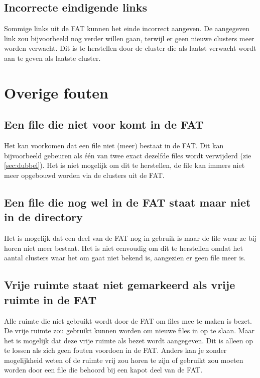 \documentclass[11pt]{article}
\begin{document}
	\subsection{Incorrecte eindigende links}\label{sec:links}
	Sommige links uit de FAT kunnen het einde incorrect aangeven. De aangegeven link zou bijvoorbeeld nog verder willen gaan, terwijl er geen nieuwe clusters meer worden verwacht. Dit is te herstellen door de cluster die als laatst verwacht wordt aan te geven als laatste cluster.

	\newpage

	\section{Overige fouten}\label{sec:overige}
	\subsection{Een file die niet voor komt in de FAT}\label{sec:dir}
	Het kan voorkomen dat een file niet (meer) bestaat in de FAT. Dit kan bijvoorbeeld gebeuren als \'e\'en van twee exact dezelfde files wordt verwijderd (zie \ref{sec:dubbel}). Het is niet mogelijk om dit te herstellen, de file kan immers niet meer opgebouwd worden via de clusters uit de FAT.

	\subsection{Een file die nog wel in de FAT staat maar niet in de directory}\label{sec:fat}
	Het is mogelijk dat een deel van de FAT nog in gebruik is maar de file waar ze bij horen niet meer bestaat. Het is niet eenvoudig om dit te herstellen omdat het aantal clusters waar het om gaat niet bekend is, aangezien er geen file meer is.

	\subsection{Vrije ruimte staat niet gemarkeerd als vrije ruimte in de FAT}\label{sec:vrij}
	Alle ruimte die niet gebruikt wordt door de FAT om files mee te maken is bezet. De vrije ruimte zou gebruikt kunnen worden om nieuwe files in op te slaan. Maar het is mogelijk dat deze vrije ruimte als bezet wordt aangegeven. Dit is alleen op te lossen als zich geen fouten voordoen in de FAT. Anders kan je zonder mogelijkheid weten of de ruimte vrij zou horen te zijn of gebruikt zou moeten worden door een file die behoord bij een kapot deel van de FAT.
\end{document}
